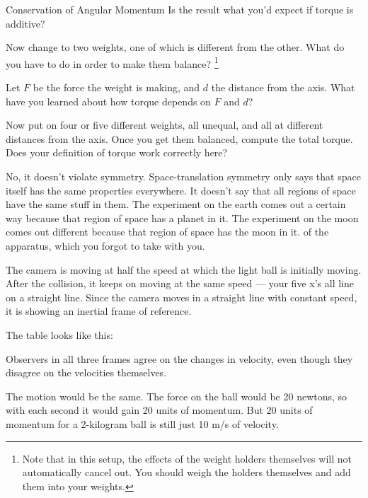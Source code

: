 \begin{lab}{Conservation of Angular Momen\-tum}
Is the result what you'd expect if torque is additive?

Now change to two weights, one of which is different from the other.
What do you have to do in order to make them balance? 
\footnote{Note that in this setup, the effects of the weight holders themselves will
not automatically cancel out. You should weigh the holders themselves and add them
into your weights.}

Let $F$ be the force the weight is making, and
$d$ the distance from the axis. What have you learned about how torque depends on
$F$ and $d$?

Now put on four or five different weights, all unequal, and all at different distances
from the axis. Once you get them balanced, compute the total torque. Does your definition
of torque work correctly here?

\end{lab}


 No, it doesn't violate symmetry. Space-translation symmetry
only says that space itself has the same properties everywhere. It doesn't say that all regions
of space have the same stuff in them. The experiment on the earth comes out a certain way because
that region of space has a planet in it. The experiment on the moon comes out different because
that region of space has the moon in it. of the apparatus, which you forgot to take with you.

 The camera is moving at half the speed at which the light ball is initially
moving. After the collision, it keeps on moving at the same speed --- your five x's all line
on a straight line. Since the camera moves in a straight line with constant speed, it is
showing an inertial frame of reference.

 The table looks like this:


\noindent Observers in all three frames agree on the changes in velocity, even though they disagree
on the velocities themselves.

 The motion would be the same. The force on the ball would be 20 newtons,
so with each second it would gain 20 units of momentum. But 20 units of momentum for a 2-kilogram
ball is still just 10 m/s of velocity.
